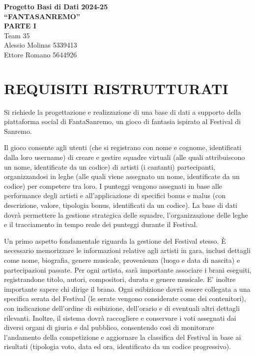 \documentclass[a4paper,12pt]{article}
\begin{document}
\begin{center}
    {\LARGE \textbf{Progetto Basi di Dati 2024-25}}\\[.5cm]
    {\Large \textbf{“FANTASANREMO”}}\\[.5cm]
    {\Large \textbf{PARTE I}}\\[.8cm]
    Team 35\\[.3cm]
    Alessio Molinas 5339413\\
    Ettore Romano 5644926
\end{center}

\vspace{1cm}

\section{REQUISITI RISTRUTTURATI}
Si richiede la progettazione e realizzazione di una base di dati a supporto della piattaforma social di FantaSanremo, un gioco di fantasia ispirato al Festival di Sanremo.

Il gioco consente agli utenti (che si registrano con nome e cognome, identificati dalla loro username) di creare e gestire squadre virtuali (alle quali attribuiscono un nome, identificate da un codice) di artisti (i cantanti) partecipanti, organizzandosi in leghe (alle quali viene assegnato un nome, identificate da un codice) per competere tra loro. I punteggi vengono assegnati in base alle performance degli artisti e all’applicazione di specifici bonus e malus (con descrizione, valore, tipologia bonus, identificati da un codice). La base di dati dovrà permettere la gestione strategica delle squadre, l’organizzazione delle leghe e il tracciamento in tempo reale dei punteggi durante il Festival.

Un primo aspetto fondamentale riguarda la gestione del Festival stesso. È necessario memorizzare le informazioni relative agli artisti in gara, inclusi dettagli come nome, biografia, genere musicale, provenienza (luogo e data di nascita) e partecipazioni passate. Per ogni artista, sarà importante associare i brani eseguiti, registrandone titolo, autori, compositori, durata e genere musicale. E' inoltre importante sapere chi dirige il brano. Ogni esibizione dovrà essere collegata a una specifica serata del Festival (le serate vengono considerate come dei contenitori), con indicazione dell’ordine di esibizione, dell’orario e di eventuali altri dettagli rilevanti.
Inoltre, il sistema dovrà raccogliere e conservare i voti assegnati dai diversi organi di giuria e dal pubblico, consentendo così di monitorare l’andamento della competizione e aggiornare la classifica del Festival in base ai risultati (tipologia voto, data ed ora, identificato da un codice progressivo).
\end{document}

